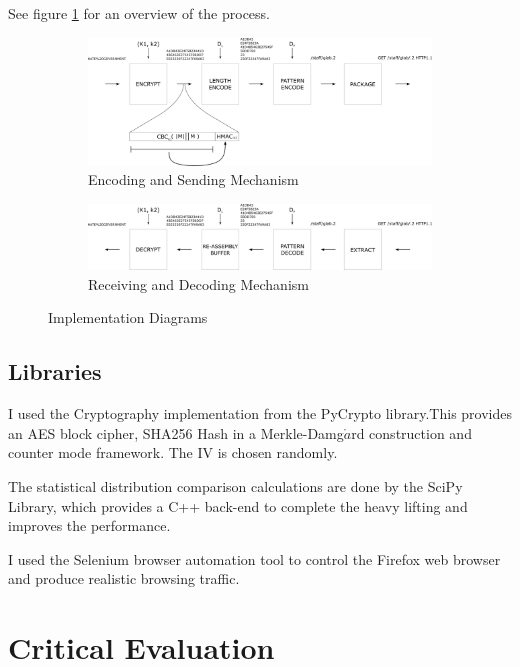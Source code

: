 \documentclass[ %
                    author={Samuel Russell},
                supervisor={Prof. Bogdan Warinschi},
                    degree={MEng},
                     title={Innocuous Ciphertexts},
                  subtitle={The DE-CENSOR Scheme},
                      type={Research},
                      year={2018} ]{dissertation}
\begin{document}
See figure \ref{fig:imp-diag} for an overview of the process.

\begin{figure}[b]
\begin{subfigure}{\textwidth}
\includegraphics[scale=0.9]{diagram-enc}
\caption{Encoding and Sending Mechanism}
\end{subfigure}

\begin{subfigure}{\textwidth}
\includegraphics[scale=0.9]{diagram-dec}
\caption{Receiving and Decoding Mechanism}
\end{subfigure}
\caption{Implementation Diagrams}
\label{fig:imp-diag}
\end{figure}

\section{Libraries}

I used the Cryptography implementation from the PyCrypto library.This provides an AES block cipher, SHA256 Hash in a Merkle-Damg$\mathring{a}$rd construction and counter mode framework. The IV is chosen randomly.

The statistical distribution comparison calculations are done by the SciPy Library, which provides a C++ back-end to complete the heavy lifting and improves the performance.

I used the Selenium browser automation tool to control the Firefox web browser and produce realistic browsing traffic.


\chapter{Critical Evaluation}
\label{chap:evaluation}
\end{document}
